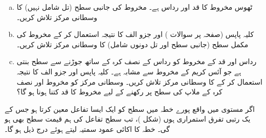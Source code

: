\begin{enumerate}[a.]
\item
ٹھوس مخروط کا قد  اور رداس  ہے۔ مخروط کی جانبی سطح (تل شامل  نہیں)  کا  وسطانی مرکز تلاش کریں۔ 
\item
کلیہ  پاپس   (صفحہ  پر سوالات )   اور جزو الف کا نتیجہ استعمال کر کے  مخروط کی مکمل سطح (جانبی سطح اور تل دونوں شامل)  کا وسطانی مرکز تلاش کریں۔
\item
رداس  اور قد   کے  مخروط  کو رداس  کے نصف کرہ  کے ساتھ جوڑنے سے  سطح   بنتی ہے جو آئس  کریم  کے مخروط  سے مشابہ ہے۔ کلیہ پاپس اور جزو الف کا نتیجہ استعمال  کر کے  کا وسطانی مرکز تلاش کریں۔ وسطانی مرکز کو مخروط اور نصف کرہ کے ملاپ کی سطح پر    رکھنے کے لیے مخروط کا قد  کتنا ہونا ہو گا؟
\end{enumerate}

اگر مستوی  میں   واقع  پورے  خطہ  میں سطح    کو ایک ایسا  تفاعل     معین کرتا ہو جس کے یک رتبی تفرق استمراری ہوں (شکل )، تب سطح   تفاعل   کی  ہم قیمت سطح   بھی ہو گی۔ خطہ  کا  اکائی عمود سمتیہ   لیتے ہوئے  درج  ذیل ہو گا۔

